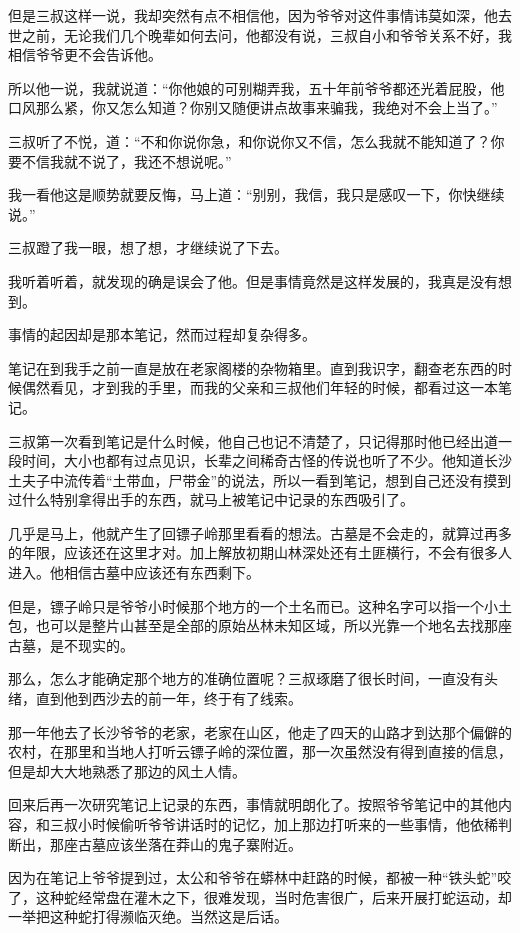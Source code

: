 但是三叔这样一说，我却突然有点不相信他，因为爷爷对这件事情讳莫如深，他去世之前，无论我们几个晚辈如何去问，他都没有说，三叔自小和爷爷关系不好，我相信爷爷更不会告诉他。

所以他一说，我就说道：“你他娘的可别糊弄我，五十年前爷爷都还光着屁股，他口风那么紧，你又怎么知道？你别又随便讲点故事来骗我，我绝对不会上当了。”

三叔听了不悦，道：“不和你说你急，和你说你又不信，怎么我就不能知道了？你要不信我就不说了，我还不想说呢。”

我一看他这是顺势就要反悔，马上道：“别别，我信，我只是感叹一下，你快继续说。”

三叔蹬了我一眼，想了想，才继续说了下去。

我听着听着，就发现的确是误会了他。但是事情竟然是这样发展的，我真是没有想到。

事情的起因却是那本笔记，然而过程却复杂得多。

笔记在到我手之前一直是放在老家阁楼的杂物箱里。直到我识字，翻查老东西的时候偶然看见，才到我的手里，而我的父亲和三叔他们年轻的时候，都看过这一本笔记。

三叔第一次看到笔记是什么时候，他自己也记不清楚了，只记得那时他已经出道一段时间，大小也都有过点见识，长辈之间稀奇古怪的传说也听了不少。他知道长沙土夫子中流传着“土带血，尸带金”的说法，所以一看到笔记，想到自己还没有摸到过什么特别拿得出手的东西，就马上被笔记中记录的东西吸引了。

几乎是马上，他就产生了回镖子岭那里看看的想法。古墓是不会走的，就算过再多的年限，应该还在这里才对。加上解放初期山林深处还有土匪横行，不会有很多人进入。他相信古墓中应该还有东西剩下。

但是，镖子岭只是爷爷小时候那个地方的一个土名而已。这种名字可以指一个小土包，也可以是整片山甚至是全部的原始丛林未知区域，所以光靠一个地名去找那座古墓，是不现实的。

那么，怎么才能确定那个地方的准确位置呢？三叔琢磨了很长时间，一直没有头绪，直到他到西沙去的前一年，终于有了线索。

那一年他去了长沙爷爷的老家，老家在山区，他走了四天的山路才到达那个偏僻的农村，在那里和当地人打听云镖子岭的深位置，那一次虽然没有得到直接的信息，但是却大大地熟悉了那边的风土人情。

回来后再一次研究笔记上记录的东西，事情就明朗化了。按照爷爷笔记中的其他内容，和三叔小时候偷听爷爷讲话时的记忆，加上那边打听来的一些事情，他依稀判断出，那座古墓应该坐落在莽山的鬼子寨附近。

因为在笔记上爷爷提到过，太公和爷爷在蟒林中赶路的时候，都被一种“铁头蛇”咬了，这种蛇经常盘在灌木之下，很难发现，当时危害很广，后来开展打蛇运动，却一举把这种蛇打得濒临灭绝。当然这是后话。

